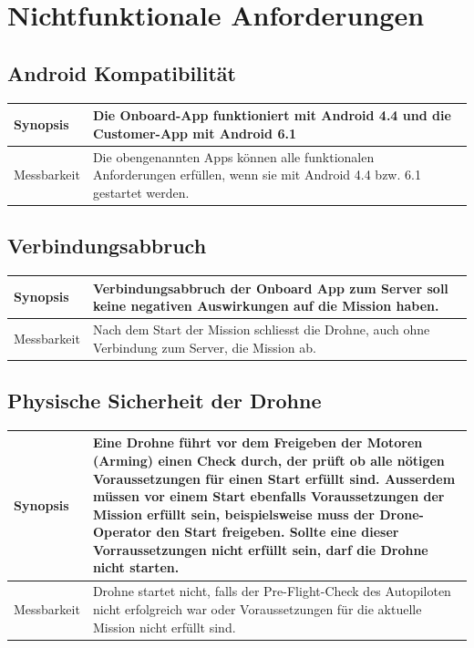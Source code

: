 \newpage
\section{Nichtfunktionale Anforderungen}

\subsection{Android Kompatibilität}
\begin{tabular}{|p{}|p{}|} \hline
	Synopsis & Die Onboard-App funktioniert mit Android 4.4 und die Customer-App mit Android 6.1\\ \hline
	Messbarkeit & Die obengenannten Apps können alle funktionalen Anforderungen erfüllen, wenn sie mit Android 4.4 bzw. 6.1 gestartet werden.\\ \hline
\end{tabular}

\subsection{Verbindungsabbruch}
\begin{tabular}{|p{}|p{}|} \hline
	Synopsis & Verbindungsabbruch der Onboard App zum Server soll keine negativen Auswirkungen auf die Mission haben.  \\ \hline
		
	Messbarkeit & Nach dem Start der Mission schliesst die Drohne, auch ohne Verbindung zum Server, die Mission ab. \\ \hline
\end{tabular}

\subsection{Physische Sicherheit der Drohne}
\begin{tabular}{|p{}|p{}|} \hline
	Synopsis & Eine Drohne führt vor dem Freigeben der Motoren (Arming) einen Check durch, der prüft ob alle nötigen Voraussetzungen für einen Start erfüllt sind. Ausserdem müssen vor einem Start ebenfalls Voraussetzungen der Mission erfüllt sein, beispielsweise muss der Drone-Operator den Start freigeben. Sollte eine dieser Vorraussetzungen nicht erfüllt sein, darf die Drohne nicht starten.  \\ \hline
	
	Messbarkeit & Drohne startet nicht, falls der Pre-Flight-Check des Autopiloten nicht erfolgreich war oder Voraussetzungen für die aktuelle Mission nicht erfüllt sind. \\ \hline
\end{tabular}
